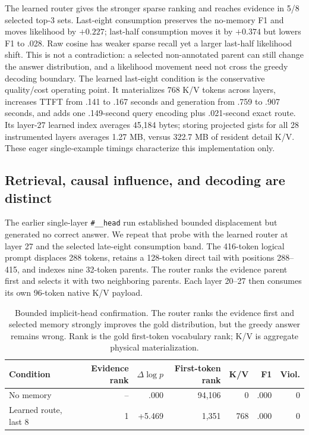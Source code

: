 \documentclass[11pt]{article}
\begin{document}
The learned router gives the stronger sparse ranking and reaches evidence in 5/8 selected top-3
sets. Last-eight consumption preserves the no-memory F1 and moves likelihood by $+0.227$;
last-half consumption moves it by $+0.374$ but lowers F1 to .028. Raw cosine has weaker sparse
recall yet a larger last-half likelihood shift. This is not a contradiction: a selected
non-annotated parent can still change the answer distribution, and a likelihood movement need
not cross the greedy decoding boundary. The learned last-eight condition is the conservative
quality/cost operating point. It materializes 768 K/V tokens across layers, increases TTFT from
.141 to .167 seconds and generation from .759 to .907 seconds, and adds one .149-second query
encoding plus .021-second exact route. Its layer-27 learned index averages 45,184 bytes; storing
projected gists for all 28 instrumented layers averages 1.27 MB, versus 322.7 MB of resident
detail K/V. These eager single-example timings characterize this implementation only.

\subsection{Retrieval, causal influence, and decoding are distinct}

The earlier single-layer \texttt{\#\_\_head} run established bounded displacement but generated
no correct answer. We repeat that probe with the learned router at layer 27 and the selected
late-eight consumption band. The 416-token logical prompt displaces 288 tokens, retains a
128-token direct tail with positions 288--415, and indexes nine 32-token parents. The router
ranks the evidence parent first and selects it with two neighboring parents. Each layer 20--27
then consumes its own 96-token native K/V payload.

\begin{table}[H]
\centering
\small
\caption{Bounded implicit-head confirmation. The router ranks the evidence first and selected
memory strongly improves the gold distribution, but the greedy answer remains wrong. Rank is the
gold first-token vocabulary rank; K/V is aggregate physical materialization.}
\label{tab:canonical-confirmation}
\begin{tabular}{lrrrrrr}
\toprule
Condition & Evidence rank & $\Delta\log p$ & First-token rank & K/V & F1 & Viol. \\
\midrule
No memory & -- & .000 & 94,106 & 0 & .000 & 0 \\
Learned route, last 8 & 1 & +5.469 & 1,351 & 768 & .000 & 0 \\
\bottomrule
\end{tabular}
\end{table}
\end{document}
